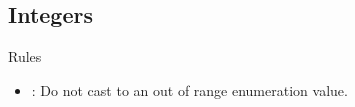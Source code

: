 \subsection{Integers}

\begin{frame}[t]{Rules}
\begin{itemize}
  \item {}: 
        Do not cast to an out of range enumeration value.
\end{itemize}
\end{frame}
